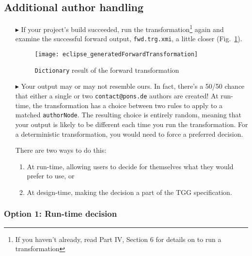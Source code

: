 \newpage
\hypertarget{t2m close}{}
\subsection{Additional author handling}
\genHeader

\begin{itemize}

\item[$\blacktriangleright$] If your project's build succeeded, run the transformation\footnote{If you haven't already, read Part IV, Section 6 for details on to run a transformation} again and examine the successful forward output, 
\texttt{fwd.trg.xmi}, a little closer (Fig.~\ref{eclipse:generatedFwdTrsfm}).

\vspace{0.5cm}

\begin{figure}[htbp]
\begin{center}
  \texttt{[image: eclipse\_generatedForwardTransformation]}
  \caption{\texttt{Dictionary} result of the forward transformation}
  \label{eclipse:generatedFwdTrsfm}
\end{center}
\end{figure} 

\vspace{0.5cm}

\item[$\blacktriangleright$] Your output may or may not resemble ours. In fact, there's a 50/50 chance that either a single or two \texttt{contact@pons.de} authors are created!
At run-time, the transformation has a choice between two rules to apply to a matched \texttt{authorNode}. 
The resulting choice is entirely random, meaning that your output is likely to be different each time you run the transformation. 
For a deterministic transformation, you would need to force a preferred decision. 

\noindent There are two ways to do this: 
\begin{enumerate}
\item At run-time, allowing users to decide for themselves what they would prefer to use, or 
\item At design-time, making the decision a part of the TGG specification.
\end{enumerate}

\vfill

\end{itemize}

\subsubsection{Option 1: Run-time decision}

